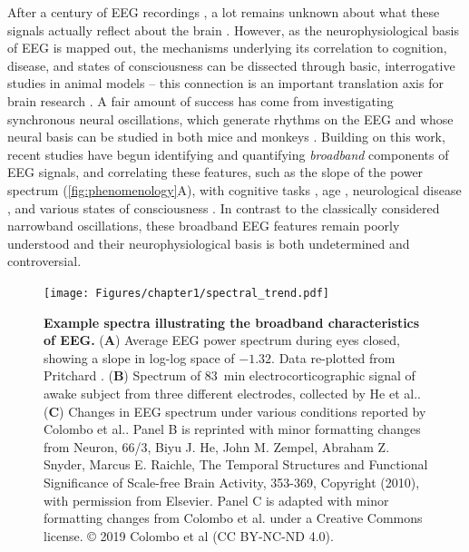 After a century of EEG recordings \cite{Berger1929}, a lot remains unknown about what these signals actually reflect about the brain \cite{Cohen2017}. However, as the neurophysiological basis of EEG is mapped out, the mechanisms underlying its correlation to cognition, disease, and states of consciousness can be dissected through basic, interrogative studies in animal models -- this connection is an important translation axis for brain research \cite{da2013eeg}. A fair amount of success has come from investigating synchronous neural oscillations, which generate rhythms on the EEG and whose neural basis can be studied in both mice and monkeys \cite{Buzsaki2004}. Building on this work, recent studies have begun identifying and quantifying \textit{broadband} components of EEG signals, and correlating these features, such as the slope of the power spectrum (\autoref{fig:phenomenology}A), with cognitive tasks \cite{Ouyang2020,Podvalny2015,He2010,Waschke2021}, age \cite{Voytek2015}, neurological disease \cite{Wang2022, Pertermann2019, Schaworonkow2021, OSTLUND2021100931, MOLINA2020562, Robertson2019, Roche2019}, and various states of consciousness \cite{Colombo2019, Stock2020, Lendner2020, MUTHUKUMARASWAMY2018582}. In contrast to the classically considered narrowband oscillations, these broadband EEG features remain poorly understood and their neurophysiological basis is both undetermined and controversial. 

\begin{figure}[b!]
    \centering
    \texttt{[image: Figures/chapter1/spectral\_trend.pdf]}
    
    \caption{\textbf{Example spectra illustrating the broadband characteristics of EEG.} 
    (\textbf{A}) Average EEG power spectrum during eyes closed, showing a slope in log-log space of $-1.32$. Data re-plotted from Pritchard \cite{Pritchard1992}. (\textbf{B}) Spectrum of \qty{83}{\minute} electrocorticographic signal of awake subject from three different electrodes, collected by He et al.\cite{He2010}.  (\textbf{C}) Changes in EEG spectrum under various conditions reported by Colombo et al.\cite{Colombo2019}. Panel B is reprinted with minor formatting changes from Neuron, 66/3, Biyu J. He, John M. Zempel, Abraham Z. Snyder, Marcus E. Raichle, The Temporal Structures and Functional Significance of Scale-free Brain Activity, 353-369, Copyright (2010), with permission from Elsevier. Panel C is adapted with minor formatting changes from Colombo et al. \cite{Colombo2019} under a Creative Commons license. © 2019 Colombo et al (CC BY-NC-ND 4.0).
    } 
    \label{fig:phenomenology}
\end{figure}

